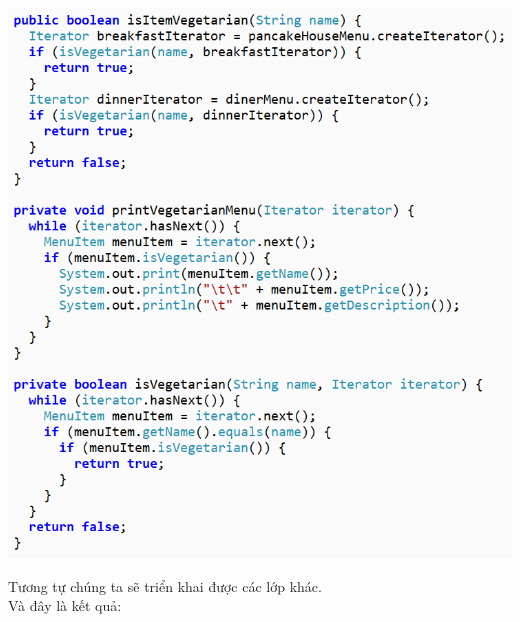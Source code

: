 \begin{center}
	\includegraphics[width=1\columnwidth,height=0.7\textheight]{GALLEYS/images/chapter3/images11}\\
\end{center}
Tương tự chúng ta sẽ triển khai được các lớp khác.\\
Và đây là kết quả:
